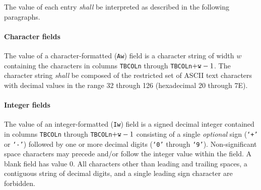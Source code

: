 \documentclass[11pt,makeidx]{book}     %
\begin{document}
The value of each entry {\em shall} be interpreted as described in the 
following paragraphs.
 
   \paragraph{Character fields} The value of a  character-formatted ({\tt A}{\tt w\/}) field is a
   character string  of width $w$ containing the characters in columns
   {\tt TBCOL}{\tt n\/} through {\tt TBCOL}{\tt n}$ + {\tt w} - 1$.
   The character string {\em shall} be
   composed of the restricted set of ASCII text characters with  
   decimal values in the range 32 through 126 (hexadecimal 20 through 7E).
   
   \paragraph{Integer fields} The value of an integer-formatted ({\tt I}{\tt w\/}) field is a
   signed decimal integer contained in columns {\tt TBCOL}{\tt n\/} through 
   {\tt TBCOL}{\tt n}$ + {\tt w} - 1$ consisting of a single {\em optional} sign 
   ({\tt `+'} or {\tt `-'}) followed by one or more decimal digits 
   ({\tt `0'} through {\tt `9'}).  Non-significant space characters may precede and/or follow
   the integer value within the field.
   A blank field has value 0.  All characters other
   than leading and trailing spaces, a contiguous string of decimal digits,
   and a single leading sign character are forbidden.
   
\end{document}
